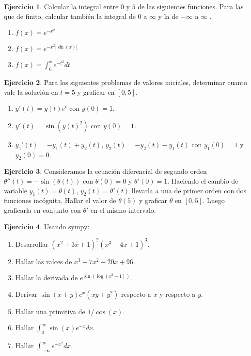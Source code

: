 \documentclass[a4paper,12pt]{book}
\theoremstyle{definition}
\newtheorem{ejercicio}{Ejercicio}
\begin{document}
	\begin{ejercicio}
		Calcular la integral entre $0$ y $5$ de las siguientes funciones. Para las que de finito, calcular también la integral de $0$ a $\infty$ y la de $-\infty$ a $\infty$ .
		\begin{enumerate}
			\item $f(x) = e^{-x^2}$
			\item $f(x) = e^{-x^2|\sin(x)|}$
			\item $f(x) = \int_0^xe^{-t^2}dt$
		\end{enumerate}
	\end{ejercicio}
	
	\begin{ejercicio}
		Para los siguientes problemas de valores iniciales, determinar cuanto vale la solución en $t=5$ y graficar en $[0,5]$.
		\begin{enumerate}
			\item $y'(t) = y(t)e^t$ con $y(0) = 1$.
			\item $y'(t) = \sin(y(t)^2)$ con $y(0) = 1$.
			\item $y_1'(t) = -y_1(t) + y_2(t)$, $y_2(t) = -y_2(t) - y_1(t)$ con $y_1(0) = 1$ y $y_2(0) = 0$.
		\end{enumerate}
	\end{ejercicio}
	\begin{ejercicio}
		Consideramos la ecuación diferencial de segundo orden $\theta''(t) = -\sin(\theta(t))$ con $\theta(0) = 0$ y $\theta'(0) = 1$. Haciendo el cambio de variable  $y_1(t) = \theta(t)$, $y_2(t) = \theta'(t)$ llevarla a una de primer orden con dos funciones incógnita. Hallar el valor de $\theta(5)$ y graficar $\theta$ en $[0,5]$. Luego graficarla en conjunto con $\theta'$ en el mismo intervalo.
	\end{ejercicio}
	\begin{ejercicio}
		Usando sympy:
		\begin{enumerate}
			\item Desarrollar $(x^2+3x+1)^2(x^3-4x+1)^3$.
			\item Hallar las raíces de $x^3 - 7x^2-20x+96$.
			\item Hallar la derivada de $e^{\sin(\log(x^2+1))}$.
			\item Derivar $\sin(x+y)e^x(xy+y^2)$ respecto a $x$ y respecto a $y$.
			\item Hallar una primitiva de $1/\cos(x)$.
			\item Hallar $\int_0^\infty \sin(x)e^{-x}dx$.
			\item Hallar $\int_{-\infty}^\infty e^{-x^2}dx$.
		\end{enumerate} 
	\end{ejercicio}
	
\end{document}
